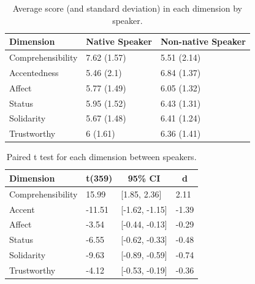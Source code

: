 \documentclass[
  man,floatsintext]{apa6}
\begin{document}
\begin{table}[tbp]

\begin{center}
\begin{threeparttable}

\caption{\label{tab:tab5}Average score (and standard deviation) in each dimension by speaker.}

\begin{tabular}{lll}
\toprule
Dimension & \multicolumn{1}{c}{Native Speaker} & \multicolumn{1}{c}{Non-native Speaker}\\
\midrule
Comprehensibility & 7.62 (1.57) & 5.51 (2.14)\\
Accentedness & 5.46 (2.1) & 6.84 (1.37)\\
Affect & 5.77 (1.49) & 6.05 (1.32)\\
Status & 5.95 (1.52) & 6.43 (1.31)\\
Solidarity & 5.67 (1.48) & 6.41 (1.24)\\
Trustworthy & 6 (1.61) & 6.36 (1.41)\\
\bottomrule
\end{tabular}

\end{threeparttable}
\end{center}

\end{table}

\begin{table}[tbp]

\begin{center}
\begin{threeparttable}

\caption{\label{tab:tab6}Paired t test for each dimension between speakers.}

\begin{tabular}{llll}
\toprule
Dimension & \multicolumn{1}{c}{t(359)} & \multicolumn{1}{c}{95\% CI} & \multicolumn{1}{c}{d}\\
\midrule
Comprehensibility & 15.99 & {}[1.85, 2.36] & 2.11\\
Accent & -11.51 & {}[-1.62, -1.15] & -1.39\\
Affect & -3.54 & {}[-0.44, -0.13] & -0.29\\
Status & -6.55 & {}[-0.62, -0.33] & -0.48\\
Solidarity & -9.63 & {}[-0.89, -0.59] & -0.74\\
Trustworthy & -4.12 & {}[-0.53, -0.19] & -0.36\\
\bottomrule
\end{tabular}

\end{threeparttable}
\end{center}

\end{table}
\end{document}
